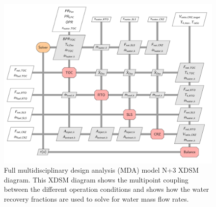 \documentclass[conf]{new-aiaa}
\begin{document}
\begin{figure}[hbt!]
    \centering
    \includegraphics[width=\textwidth]{N3_xdsm_full.pdf}
    \caption{
        Full multidisciplinary design analysis (MDA) model N+3 XDSM diagram.
        This XDSM diagram shows the multipoint coupling between the different operation conditions and shows how the water recovery fractions are used to solve for water mass flow rates.
    }
    \label{fig:N3_xdsm_full}
\end{figure}
\end{document}
